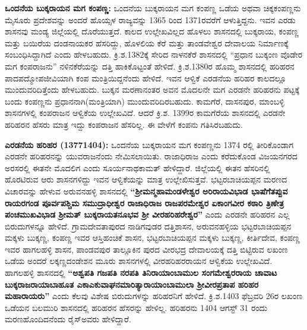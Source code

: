 \textbf{ಒಂದನೆಯ ಬುಕ್ಕರಾಯನ ಮಗ ಕಂಪಣ್ಣ:} ಒಂದನೆಯ ಬುಕ್ಕರಾಯನ ಮಗ ಕಂಪಣ್ಣ ಒಡೆಯ ಅಥವಾ ಚಿಕ್ಕಕಂಪಣ್ಣನು ಮೈಸೂರು ಪ್ರದೇಶವನ್ನು ಅಂದರೆ ಹೊಯ್ಸಳ ರಾಜ್ಯವನ್ನು 1365 ರಿಂದ 1371ರವರೆಗೆ ಆಳುತ್ತಿದ್ದನು. ಇವನ ಎರಡು ಶಾಸನವು ಮಂಡ್ಯ ಜಿಲ್ಲೆಯಲ್ಲಿ ದೊರೆಯುತ್ತದೆ. ಕಾಲದ ಉಲ್ಲೇಖವಿಲ್ಲದ ಹೊಳಲು ಶಾಸನದಲ್ಲಿ ಬುಕ್ಕರಾಯ, ಕಂಪಣ್ಣ ಮತ್ತು ಬಯಿರೆಯ ದಂಡನಾಯಕರ ಹೆಸರಿದ್ದು, ಹೊಳಲಿಯ ಕೆರೆ ಮತ್ತು ತಾಂಡವೇಶ್ವರ ದೇವಾಲಯ ನಿರ್ಮಾಣಕ್ಕೆ ಸಂಬಂಧಿಸಿದ್ದಾಗಿದೆ ಎಂದು ಹೇಳಬಹುದು. ಕ್ರಿ.ಶ.1382ಕ್ಕೆ ಸೇರಿದ ನಾಳನಕೆರೆ ಶಾಸನದಲ್ಲಿ “ಪ್ರಧಾನ ಬುಕ್ಕಂಣ ವೊಡೇರ ಮಗ ಕಂಪರಾಜನು” ನಳಿನಕೆರೆಯನ್ನು ದತ್ತಿ ಹಾಕಿಕೊಟ್ಟಂತೆ ಹೇಳಿದೆ. ಕ್ರಿ.ಶ.1380ರ ಹೊಮ್ಮ ಶಾಸನದಲ್ಲಿ ಹರಿಹರನ ಪಾದಪದ್ಮೋಪಜೀವಿಯಾಗಿ ಕಂಪ ಮಂತ್ರಿಯಿದ್ದನೆಂದು ಹೇಳಿದೆ. ಇವನ ಆಳ್ವಿಕೆ ಎರಡನೆಯ ಹರಿಹರ ಕಾಲದಲ್ಲೂ ಮುಂದುವರಿದಿತ್ತೆಂದು ಹೇಳಬಹುದು. ಬುಕ್ಕನ ಮರಣಾನಂತರ ಅವನ ಮೊದಲನೇ ಮಗ ಎರಡನೇ ಹರಿಹರನು ಪಟ್ಟಕ್ಕೆ ಬಂದು ಕಂಪಣ್ಣನು ಪ್ರಧಾನನಾಗಿ(ಮಂತ್ರಿಯಾಗಿ) ಮುಂದುವರಿದಿರಬಹುದು. ಕಾಮಗೆರೆ, ದಾಸನಪುರ, ಮಾಂಬಳ್ಳಿ ಶಾಸನಗಳಲ್ಲಿ ಕಂಪರಾಜನ ಆಳ್ವಿಕೆಯ ಉಲ್ಲೇಖವಿದೆ. ಆದರೆ ಕ್ರಿ.ಶ. 1399ರ ಕಾಮಗೆರೆಯ ಶಾಸನದಲ್ಲಿ ಎರಡನೇ ಹರಿಹರನ ಹೆಸರು ಮಾತ್ರ ಇದ್ದು ಕಂಪರಾಜನ ಹೆಸರಿಲ್ಲ. ಈ ವೇಳೆಗೆ ಕಂಪನು ಗತಿಸಿರಬಹುದು.

\textbf{ಎರಡನೆಯ ಹರಿಹರ (1377\general{\enginline{-}}1404):} ಒಂದನೆಯ ಬುಕ್ಕರಾಯನ ಮಗ ಕಂಪಣ್ಣನು 1374 ರಲ್ಲಿ ತೀರಿಕೊಂಡಾಗ ಎರಡನೇ ಹರಿಹರನನ್ನು ಯುವರಾಜನೆಂದು ನೇಮಿಸಲಾಯಿತು. ರಾಜಾಧಿರಾಜ ಎಂದು ಕರೆದುಕೊಂಡ ವಿಜಯನಗರದ ಅರಸರಲ್ಲಿ ಈತನೇ ಮೊದಲಿಗ ಎಂದು ಸೂರ್ಯನಾಥಕಾಮತ್​ ಹೇಳಿದ್ದಾರೆ. ಜಿಲ್ಲೆಯಲ್ಲಿ ಈತನ ಹೆಸರಿನಲ್ಲಿ ಹೊರಟಿರುವ ಆರು ಶಾಸನಗಳಿದ್ದು ಇವನ ಆಳ್ವಿಕೆಯನ್ನು ಮಾತ್ರ ಉಲ್ಲೇಖಿಸುತ್ತವೆ. ಭಟ್ಟರಬಾಚಿಯಪ್ಪನ ಮರಣದ ವಿಚಾರವನ್ನು ಹೇಳುವ ಅರುವನಹಳ್ಳಿ ಶಾಸನದಲ್ಲಿ \textbf{“ಶ‍್ರೀಮನ್ಮಹಾಮಂಡಳೇಶ್ವರ ಅರಿರಾಯವಿಭಾಡ ಭಾಷೆಗೆತಪ್ಪುವ ರಾಯರಗಂಡ ಪೂರ್ವಪಶ್ಚಿಮ ಸಮುದ್ರಾಧೀಶ್ವರ ರಾಜಾಧಿರಾಜ ರಾಜಪರಮೇಶ್ವರ ಏಕಾಂಗವೀರ ಕಠಾರಿ ತ್ರಿಣೇತ್ರ ಪಂಚಮುಖವಿಭಾಡ ಶ‍್ರೀಮತ್​ ಬುಕ್ಕರಾಯ\-ತನೂಭವ ಶ‍್ರೀ ವೀರಹರಿಹರೇಶ್ವರ”} ಎಂದು ಎರಡನೇ ಹರಿಹರನ ಎಲ್ಲ ಬಿರುದುಗಳನ್ನೂ ಹೇಳಿದೆ. ಗ್ರಾಮದೇವತಾಪುರದ ನಾಡಿಗವುಡರ ದತ್ತಿಶಾಸನ, ಅರುವನಹಳ್ಳಿಯ ಭಟ್ಟರಬಾಚಿಯಪ್ಪನ ಮಕ್ಕಳು ಬುಕ್ಕಣ್ಣ, ಕಂಪಣ್ಣ ಇವರ ಆಸ್ತಿಹಂಚಿಕೆ ಶಾಸನ, ಭಟ್ಟರಬಾಚಿಯಪ್ಪನ ಮಕ್ಕಳು ಬುಕ್ಕಣ್ಣ, ಕೀರ್ತಿದೇವ, ಕಂಪಣ್ಣ ಇವರ ಹಾಗಲಹಳ್ಳಿ ಶಾಸನ, ಪಾಂಡವಪುರ ತಾಲ್ಲೂಕಿನ ಪುರದ ವೀರಭದ್ರ ದೇವಾಲಯಕ್ಕೆ ದತ್ತಿ ಬಿಟ್ಟಿರುವ ಲಖಂಣ ಒಡೆಯ ಅಂದರೆ ಲಕ್ಕಣ್ಣದಂಡೇಶನ ಮೂರು ಶಾಸನಗಳಲ್ಲಿ ವೀರಹರಿಹರರಾಯನ ಆಳ್ವಿಕೆಯ ಉಲ್ಲೇಖವಿದೆ. ಹಾಗಲಹಳ್ಳಿ ಶಾಸನದಲ್ಲಿ \textbf{“ಅಶ್ವಪತಿ ಗಜಪತಿ ನರಪತಿ ತಿನಿರಾಯಾಂಬಾಮುಲ ಸಂಗಮೇಶ್ವರರಾಯ ಚಾವಾಟ ಬುಕ್ಕರಾಜರಾಯಾಬಾಹೂತ ಎಕಾಎಕುವಾಘನಮಾರಿತ್ಯಾರಾಯಾಂ\-ಬಾಮುಲಾ ಶ‍್ರೀವೀರಪ್ರತಾಪ ಹರಿಹರ ಮಹಾರಾಯರು”} ಎಂದು ಕೆಲವು ವಿಶೇಷ ಬಿರುದುಗಳನ್ನು ಹರಿಹರನಿಗೆ ಹೇಳಿದೆ. ಕ್ರಿ.ಶ.1403 ಫೆಬ್ರವರಿ 26ರ ಲಖಂಣ ಒಡೆಯನ ಬಲಮುರಿ ಶಾಸನದಲ್ಲಿ ಹರಿಹರನ ಹೆಸರನ್ನು ಹೇಳಿಲ್ಲ. ಹರಿಹರನು 1404 ಆಗಸ್ಟ್​ 31 ರಂದು ಮರಣಹೊಂದಿದನೆಂದು ರೈಸ್​ ಅವರು ಹೇಳಿದ್ದಾರೆ.

